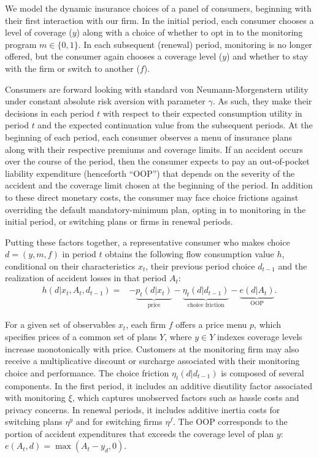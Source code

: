 We model the dynamic insurance choices of a panel of consumers, beginning with their first interaction with our firm. In the initial period, each consumer chooses a level of coverage ($y$) along with a choice of whether to opt in to the monitoring program $m \in \{0,1\}$. In each subsequent (renewal) period, monitoring is no longer offered, but the consumer again chooses a coverage level ($y$) and whether to stay with the firm or switch to another ($f$).

Consumers are forward looking with standard von Neumann-Morgenstern utility under constant absolute risk aversion with parameter $\gamma$. As such, they make their decisions in each period $t$ with respect to their expected consumption utility in period $t$ and the expected continuation value from the subsequent periods. At the beginning of each period, each consumer observes a menu of insurance plans along with their respective premiums and coverage limits. If an accident occurs over the course of the period, then the consumer expects to pay an out-of-pocket liability expenditure (henceforth ``OOP'') that depends on the severity of the accident and the coverage limit chosen at the beginning of the period. In addition to these direct monetary costs, the consumer may face {choice frictions} against overriding the default mandatory-minimum plan, opting in to monitoring in the initial period, or switching plans or firms in renewal periods.

Putting these factors together, a representative consumer who makes choice $d=({y,m,f})$ in period $t$ obtains the following flow consumption value $h$, conditional on their characteristics $x_{t}$, their previous period choice $d_{t-1}$ and the realization of accident losses in that period $A_{t}$:
\begin{align}\label{eq:flow_consumption}
h(d|x_{t}, {A}_{t},d_{t-1})= & -\underbrace{{p_{t}}(d | x_{t})}_{\text{price}}-\underbrace{\eta_{t}(d | d_{t-1})}_{\text{choice friction}}-\underbrace{e(d|{A}_{t})}_{\text{OOP}}.
\end{align}

For a given set of observables $x_t$,
each firm $f$ offers a price menu $p$, which specifies prices of a common set of plans $Y$, where $y\in Y$ indexes coverage levels increase monotonically with price. Customers at the monitoring firm may also receive a multiplicative discount or surcharge associated with their monitoring choice and performance. The choice friction $\eta_{t}(d | d_{t-1})$ is composed of several components. In the first period, it includes an additive disutility factor associated with monitoring $\xi$, which captures unobserved factors such as hassle costs and privacy concerns. In renewal periods, it includes additive inertia costs for switching plans $\eta^{y}$ and for switching firms $\eta^{f}$.  The OOP corresponds to the portion of accident expenditures that exceeds the coverage level of plan $y$: $e({A}_{t},d) = \max(A_{t} - y_{d}, 0)$.

